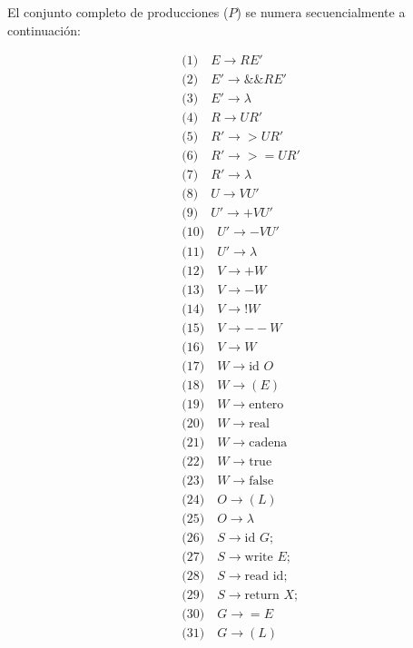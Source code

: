 \documentclass{article}
\begin{document}
El conjunto completo de producciones ($P$) se numera secuencialmente a continuación:

\noindent
\begin{minipage}[t]{0.48\textwidth}
\small
\[ \begin{aligned}
    &\text{(1)} \quad E \to R E' \\
    &\text{(2)} \quad E' \to \&\& R E' \\
    &\text{(3)} \quad E' \to \lambda \\
    &\text{(4)} \quad R \to U R' \\
    &\text{(5)} \quad R' \to > U R' \\
    &\text{(6)} \quad R' \to >= U R' \\
    &\text{(7)} \quad R' \to \lambda \\
    &\text{(8)} \quad U \to V U' \\
    &\text{(9)} \quad U' \to + V U' \\
    &\text{(10)} \quad U' \to - V U' \\
    &\text{(11)} \quad U' \to \lambda \\
    &\text{(12)} \quad V \to + W  \\
    &\text{(13)} \quad V \to - W \\
    &\text{(14)} \quad V \to ! W \\
    &\text{(15)} \quad V \to -- W  \\
    &\text{(16)} \quad V \to W \\
    &\text{(17)} \quad W \to \text{id } O \\
    &\text{(18)} \quad W \to ( E ) \\
    &\text{(19)} \quad W \to \text{entero} \\
    &\text{(20)} \quad W \to \text{real}  \\
    &\text{(21)} \quad W \to \text{cadena} \\
    &\text{(22)} \quad W \to \text{true} \\
    &\text{(23)} \quad W \to \text{false} \\
    &\text{(24)} \quad O \to ( L ) \\
    &\text{(25)} \quad O \to \lambda  \\
    &\text{(26)} \quad S \to \text{id } G ; \\
    &\text{(27)} \quad S \to \text{write } E ; \\
    &\text{(28)} \quad S \to \text{read id} ; \\
    &\text{(29)} \quad S \to \text{return } X ; \\
    &\text{(30)} \quad G \to = E  \\
    &\text{(31)} \quad G \to ( L ) \\
\end{aligned} \]
\end{minipage}
\end{document}
